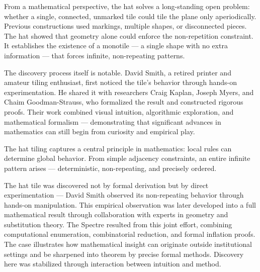 From a mathematical perspective, the hat solves a long-standing open problem: whether a single, connected, unmarked tile could tile the plane only aperiodically. Previous constructions used markings, multiple shapes, or disconnected pieces. The hat showed that geometry alone could enforce the non-repetition constraint. It establishes the existence of a monotile — a single shape with no extra information — that forces infinite, non-repeating patterns.

The discovery process itself is notable. David Smith, a retired printer and amateur tiling enthusiast, first noticed the tile’s behavior through hands-on experimentation. He shared it with researchers Craig Kaplan, Joseph Myers, and Chaim Goodman-Strauss, who formalized the result and constructed rigorous proofs. Their work combined visual intuition, algorithmic exploration, and mathematical formalism — demonstrating that significant advances in mathematics can still begin from curiosity and empirical play.

The hat tiling captures a central principle in mathematics: local rules can determine global behavior. From simple adjacency constraints, an entire infinite pattern arises — deterministic, non-repeating, and precisely ordered.
\clearpage

\begin{commentary}
The hat tile was discovered not by formal derivation but by direct experimentation — David Smith observed its non-repeating behavior through hands-on manipulation. This empirical observation was later developed into a full mathematical result through collaboration with experts in geometry and substitution theory. The Spectre resulted from this joint effort, combining computational enumeration, combinatorial reduction, and formal inflation proofs. The case illustrates how mathematical insight can originate outside institutional settings and be sharpened into theorem by precise formal methods. Discovery here was stabilized through interaction between intuition and method.
\end{commentary}

\vspace{2em}

